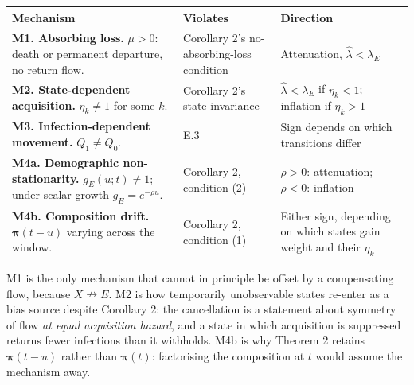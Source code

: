 {%
\begin{longtable}[]{@{}
  >{\raggedright\arraybackslash}p{}
  >{\raggedright\arraybackslash}p{}
  >{\raggedright\arraybackslash}p{}@{}}
\toprule\noalign{}
\begin{minipage}[b]{\linewidth}\raggedright
Mechanism
\end{minipage} & \begin{minipage}[b]{\linewidth}\raggedright
Violates
\end{minipage} & \begin{minipage}[b]{\linewidth}\raggedright
Direction
\end{minipage} \\
\midrule\noalign{}
\endhead
\bottomrule\noalign{}
\endlastfoot
\textbf{M1. Absorbing loss.} \(\mu>0\): death or permanent departure, no return flow. & Corollary 2's no-absorbing-loss condition & Attenuation, \(\hat\lambda<\lambda_E\) \\
\textbf{M2. State-dependent acquisition.} \(\eta_k\ne1\) for some \(k\). & Corollary 2's state-invariance & \(\hat\lambda<\lambda_E\) if \(\eta_k<1\); inflation if \(\eta_k>1\) \\
\textbf{M3. Infection-dependent movement.} \(Q_1\ne Q_0\). & E.3 & Sign depends on which transitions differ \\
\textbf{M4a. Demographic non-stationarity.} \(g_E(u;t)\ne1\); under scalar growth \(g_E=e^{-\rho u}\). & Corollary 2, condition (2) & \(\rho>0\): attenuation; \(\rho<0\): inflation \\
\textbf{M4b. Composition drift.} \(\boldsymbol\pi(t-u)\) varying across the window. & Corollary 2, condition (1) & Either sign, depending on which states gain weight and their \(\eta_k\) \\
\end{longtable}
}

M1 is the only mechanism that cannot in principle be offset by a compensating flow, because \(X\nrightarrow E\). M2 is how temporarily unobservable states re-enter as a bias source despite Corollary 2: the cancellation is a statement about symmetry of flow \emph{at equal acquisition hazard}, and a state in which acquisition is suppressed returns fewer infections than it withholds. M4b is why Theorem 2 retains \(\boldsymbol\pi(t-u)\) rather than \(\boldsymbol\pi(t)\): factorising the composition at \(t\) would assume the mechanism away.

